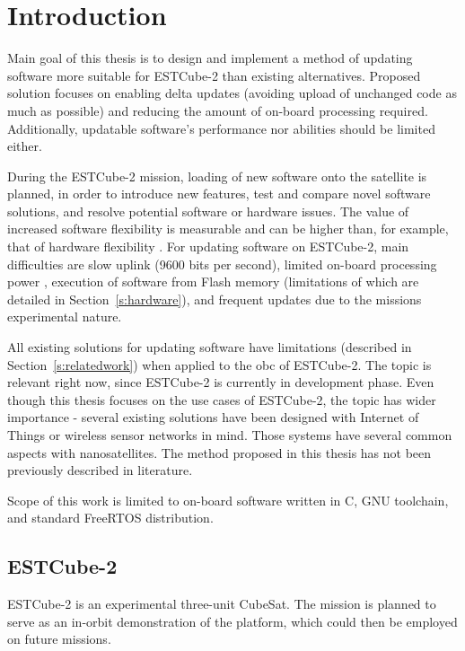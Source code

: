 \newpage
\section{Introduction}

Main goal of this thesis is to design and implement a method of updating software more suitable for ESTCube-2 than existing alternatives. Proposed solution focuses on enabling delta updates (avoiding upload of unchanged code as much as possible) and reducing the amount of on-board processing required. Additionally, updatable software's performance nor abilities should be limited either.

During the ESTCube-2 mission, loading of new software onto the satellite is planned, in order to introduce new features, test and compare novel software solutions, and resolve potential software or hardware issues. The value of increased software flexibility is measurable and can be higher than, for example, that of hardware flexibility \cite{Nilchiani2009}. For updating software on ESTCube-2, main difficulties are slow uplink (9600 bits per second), limited on-board processing power \cite{Ehrpais2016}, execution of software from Flash memory \cite{Haljaste2017} (limitations of which are detailed in Section~\ref{s:hardware}), and frequent updates due to the missions experimental nature.

All existing solutions for updating software have limitations (described in Section~\ref{s:relatedwork}) when applied to the \gls{obc} of ESTCube-2. The topic is relevant right now, since ESTCube-2 is currently in development phase. Even though this thesis focuses on the use cases of ESTCube-2, the topic has wider importance - several existing solutions have been designed with Internet of Things or wireless sensor networks \cite{Dunkels2006,Han2005} in mind. Those systems have several common aspects with nanosatellites. The method proposed in this thesis has not been previously described in literature.

Scope of this work is limited to on-board software written in C, GNU toolchain, and standard FreeRTOS distribution.

\subsection{ESTCube-2}

ESTCube-2 is an experimental three-unit CubeSat. The mission is planned to serve as an in-orbit demonstration of the platform, which could then be employed on future missions. \cite{Iakubivskyi2016}


